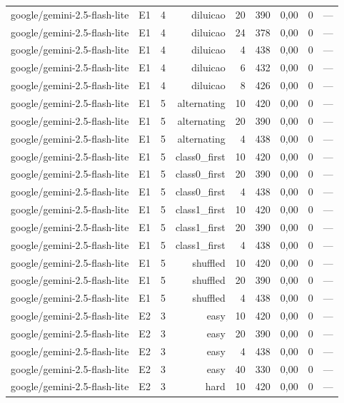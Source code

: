 \begin{table}[htbp]
\begin{tabular}{lllrrrrrr}
google/gemini-2.5-flash-lite & E1 & 4 & diluicao & 20 & 390 & 0,00 & 0 & — \\
google/gemini-2.5-flash-lite & E1 & 4 & diluicao & 24 & 378 & 0,00 & 0 & — \\
google/gemini-2.5-flash-lite & E1 & 4 & diluicao & 4 & 438 & 0,00 & 0 & — \\
google/gemini-2.5-flash-lite & E1 & 4 & diluicao & 6 & 432 & 0,00 & 0 & — \\
google/gemini-2.5-flash-lite & E1 & 4 & diluicao & 8 & 426 & 0,00 & 0 & — \\
google/gemini-2.5-flash-lite & E1 & 5 & alternating & 10 & 420 & 0,00 & 0 & — \\
google/gemini-2.5-flash-lite & E1 & 5 & alternating & 20 & 390 & 0,00 & 0 & — \\
google/gemini-2.5-flash-lite & E1 & 5 & alternating & 4 & 438 & 0,00 & 0 & — \\
google/gemini-2.5-flash-lite & E1 & 5 & class0\_first & 10 & 420 & 0,00 & 0 & — \\
google/gemini-2.5-flash-lite & E1 & 5 & class0\_first & 20 & 390 & 0,00 & 0 & — \\
google/gemini-2.5-flash-lite & E1 & 5 & class0\_first & 4 & 438 & 0,00 & 0 & — \\
google/gemini-2.5-flash-lite & E1 & 5 & class1\_first & 10 & 420 & 0,00 & 0 & — \\
google/gemini-2.5-flash-lite & E1 & 5 & class1\_first & 20 & 390 & 0,00 & 0 & — \\
google/gemini-2.5-flash-lite & E1 & 5 & class1\_first & 4 & 438 & 0,00 & 0 & — \\
google/gemini-2.5-flash-lite & E1 & 5 & shuffled & 10 & 420 & 0,00 & 0 & — \\
google/gemini-2.5-flash-lite & E1 & 5 & shuffled & 20 & 390 & 0,00 & 0 & — \\
google/gemini-2.5-flash-lite & E1 & 5 & shuffled & 4 & 438 & 0,00 & 0 & — \\
google/gemini-2.5-flash-lite & E2 & 3 & easy & 10 & 420 & 0,00 & 0 & — \\
google/gemini-2.5-flash-lite & E2 & 3 & easy & 20 & 390 & 0,00 & 0 & — \\
google/gemini-2.5-flash-lite & E2 & 3 & easy & 4 & 438 & 0,00 & 0 & — \\
google/gemini-2.5-flash-lite & E2 & 3 & easy & 40 & 330 & 0,00 & 0 & — \\
google/gemini-2.5-flash-lite & E2 & 3 & hard & 10 & 420 & 0,00 & 0 & — \\

\end{tabular}
\end{table}
